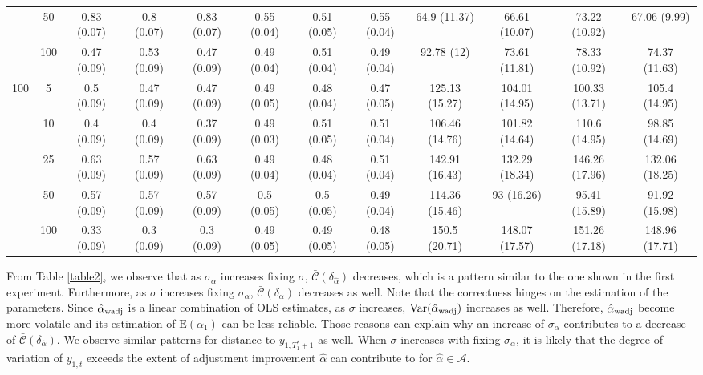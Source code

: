 \documentclass[11pt]{article}
\def\mc#1{\mathcal{#1}} %
\def\E#1{\mathrm{E}(#1)} %
\def\var#1{\mathrm{Var}(#1)} %
\theoremstyle{definition}
\begin{document}
\begin{table}[H]
\begin{center}
{\begin{tabular}{cc|ccc|ccc|cccc|}
  & 50  & 0.83 (0.07) & 0.8 (0.07) & 0.83 (0.07) & 0.55 (0.04) & 0.51 (0.05) & 0.55 (0.04) & 64.9 (11.37) & 66.61 (10.07) & 73.22 (10.92) & 67.06 (9.99) \\ 
  & 100  & 0.47 (0.09) & 0.53 (0.09) & 0.47 (0.09) & 0.49 (0.04) & 0.51 (0.04) & 0.49 (0.04) & 92.78 (12) & 73.61 (11.81) & 78.33 (10.92) & 74.37 (11.63) \\[.3cm] 
 \multirow{5}{*}{100} & 5  & 0.5 (0.09) & 0.47 (0.09) & 0.47 (0.09) & 0.49 (0.05) & 0.48 (0.04) & 0.47 (0.05) & 125.13 (15.27) & 104.01 (14.95) & 100.33 (13.71) & 105.4 (14.95) \\ 
    & 10  & 0.4 (0.09) & 0.4 (0.09) & 0.37 (0.09) & 0.49 (0.03) & 0.51 (0.05) & 0.51 (0.04) & 106.46 (14.76) & 101.82 (14.64) & 110.6 (14.95) & 98.85 (14.69) \\ 
  & 25  & 0.63 (0.09) & 0.57 (0.09) & 0.63 (0.09) & 0.49 (0.04) & 0.48 (0.04) & 0.51 (0.04) & 142.91 (16.43) & 132.29 (18.34) & 146.26 (17.96) & 132.06 (18.25) \\ 
  & 50  & 0.57 (0.09) & 0.57 (0.09) & 0.57 (0.09) & 0.5 (0.05) & 0.5 (0.05) & 0.49 (0.04) & 114.36 (15.46) & 93 (16.26) & 95.41 (15.89) & 91.92 (15.98) \\ 
    & 100  & 0.33 (0.09) & 0.3 (0.09) & 0.3 (0.09) & 0.49 (0.05) & 0.49 (0.05) & 0.48 (0.05) & 150.5 (20.71) & 148.07 (17.57) & 151.26 (17.18) & 148.96 (17.71) \\ 
\end{tabular}}
   \end{center}
      \vspace{-.5cm}
\end{table}




From Table \ref{table2}, we observe that as $\sigma_{\alpha}$ increases fixing $\sigma$, $\bar{\mc{C}}(\delta_{\hat{\alpha}})$   decreases, which is a pattern similar to the one shown in the first experiment. Furthermore, as $\sigma$ increases fixing $\sigma_{\alpha}$, $\bar{\mc{C}}(\delta_{\hat{\alpha}})$ decreases as well. Note that the correctness  hinges on the estimation of the parameters. Since $\hat{\alpha}_{\rm wadj}$  is a linear combination of OLS estimates, as $\sigma$ increases, $\var{\hat{\alpha}_{\rm wadj}}$ increases as well. Therefore, $\hat{\alpha}_{\rm wadj}$ become more volatile and its estimation of $\E{\alpha_1}$ can be less reliable. Those reasons can explain  why an increase of $\sigma_{\alpha}$ contributes to a decrease of  $\bar{\mc{C}}(\delta_{\hat{\alpha}})$.  We observe similar patterns for distance to $y_{1, T_1^*+1}$ as well. When $\sigma$ increases with fixing $\sigma_{\alpha}$, it is likely that the degree of variation of $y_{1,t}$ exceeds the extent of adjustment improvement $\hat{\alpha}$ can contribute to for $\hat{\alpha}\in \mc{A}$.
\end{document}
